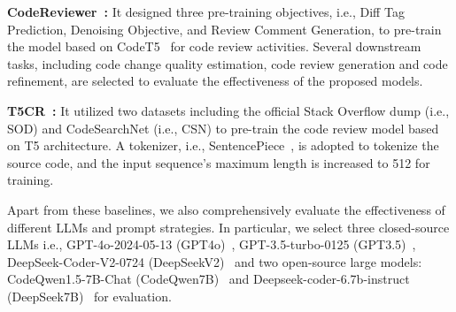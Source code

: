 \noindent \textbf{CodeReviewer~\cite{li2022automating}:} 
It designed three pre-training objectives, i.e., Diff Tag Prediction, Denoising Objective, and Review Comment Generation, to pre-train the model based on CodeT5~\cite{codet5} for code review activities. Several downstream tasks, including code change quality estimation, code review generation and code refinement, are selected to evaluate the effectiveness of the proposed models. 


\noindent \textbf{T5CR~\cite{tufano2022using}:} It utilized two datasets including the official Stack Overflow dump (i.e., SOD) and CodeSearchNet (i.e., CSN) to pre-train the code review model based on T5 architecture. A tokenizer, i.e., SentencePiece~\cite{kudo2018sentencepiece}, is adopted to tokenize the source code, and the input sequence's maximum length is increased to 512 for training. 

Apart from these baselines, we also comprehensively evaluate the effectiveness of different LLMs and prompt strategies. In particular, we select three closed-source LLMs i.e., GPT-4o-2024-05-13 (GPT4o)~\cite{achiam2023gpt}, GPT-3.5-turbo-0125 (GPT3.5)~\cite{ouyang2022training}, DeepSeek-Coder-V2-0724 (DeepSeekV2)~\cite{zhu2024deepseek} and two open-source large models: CodeQwen1.5-7B-Chat (CodeQwen7B)~\cite{bai2023qwen} and Deepseek-coder-6.7b-instruct (DeepSeek7B)~\cite{guo2024deepseek} for evaluation.





